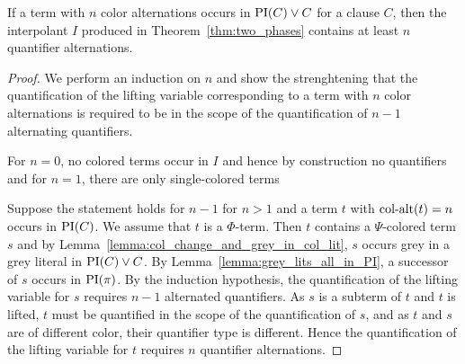 \documentclass[,%
	draft=false,%
	numbers=noendperiod
	12pt,
	a4paper,
	oneside,%
	openany,
]{memoir}
\begin{document}
\begin{prop}
	If a term with $n$ color alternations occurs in $\operatorname{PI}(C) \lor C$ for a clause $C$, then the interpolant $I$ produced in Theorem~\ref{thm:two_phases} contains at least $n$ quantifier alternations.
\end{prop}
\begin{proof}
	We perform an induction on $n$
	and show the strenghtening that
	the quantification of the lifting variable corresponding to a term with $n$ color alternations is required to be in the scope of the quantification of $n-1$ alternating quantifiers.
	
	For $n=0$, no colored terms occur in $I$ and hence by construction no quantifiers
	and for $n=1$, there are only single-colored terms 

	Suppose the statement holds for $n-1$ for $n>1$ and a term $t$ with $\operatorname{col-alt}(t) = n$ occurs in $\operatorname{PI}(C)$.
	We assume that $t$ is a $\Phi$-term.
	Then $t$ contains a $\Psi$-colored term $s$ and
	by Lemma~\ref{lemma:col_change_and_grey_in_col_lit}, $s$ occurs grey in a grey literal in $\operatorname{PI}(C) \lor C$.
	By Lemma~\ref{lemma:grey_lits_all_in_PI}, a successor of $s$ occurs in $\operatorname{PI}(\pi)$.
	By the induction hypothesis, the quantification of the lifting variable for $s$ requires $n-1$ alternated quantifiers.
	As $s$ is a subterm of $t$ and $t$ is lifted, $t$ must be quantified in the scope of the quantification of $s$, and as $t$ and $s$ are of different color, their quantifier type is different. 
	Hence the quantification of the lifting variable for $t$ requires $n$ quantifier alternations.
\end{proof}
\end{document}
